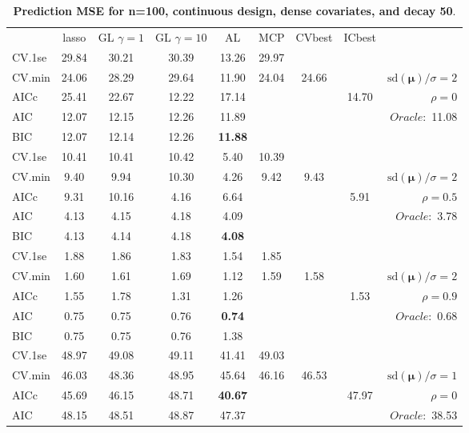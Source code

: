 \clearpage
\begin{table}\vspace{-.5cm}
\caption[l]{ { \bf Prediction MSE for n=100, continuous design, 
dense covariates, and  decay  50}.}
\vspace{-.5cm}
\footnotesize{}
\begin{center}
\begin{tabular}{l*{7}{c}|r}
 & lasso & GL $\gamma=1$ & GL $\gamma=10$ & AL & MCP  & CVbest & ICbest  \\
\cline{1-9}
CV.1se & 29.84 & 30.21 & 30.39 & 13.26 & 29.97 & & & \\
CV.min & 24.06 & 28.29 & 29.64 & 11.90 & 24.04 & 24.66 & & $\mathrm{sd}(\mathbf{\mu})/\sigma=2$ \\
AICc & 25.41 & 22.67 & 12.22 & 17.14 & & & 14.70 &  $\rho=0$ \\
AIC & 12.07 & 12.15 & 12.26 & 11.89 & & & &  \multirow{2}{*}{$Oracle: $ 11.08} \\
BIC & 12.07 & 12.14 & 12.26 & {\bf 11.88} & & & &  \\
 \hline 
CV.1se & 10.41 & 10.41 & 10.42 & 5.40 & 10.39 & & & \\
CV.min & 9.40 & 9.94 & 10.30 & 4.26 & 9.42 & 9.43 & & $\mathrm{sd}(\mathbf{\mu})/\sigma=2$ \\
AICc & 9.31 & 10.16 & 4.16 & 6.64 & & & 5.91 &  $\rho=0.5$ \\
AIC & 4.13 & 4.15 & 4.18 & 4.09 & & & &  \multirow{2}{*}{$Oracle: $ 3.78} \\
BIC & 4.13 & 4.14 & 4.18 & {\bf 4.08} & & & &  \\
 \hline 
CV.1se & 1.88 & 1.86 & 1.83 & 1.54 & 1.85 & & & \\
CV.min & 1.60 & 1.61 & 1.69 & 1.12 & 1.59 & 1.58 & & $\mathrm{sd}(\mathbf{\mu})/\sigma=2$ \\
AICc & 1.55 & 1.78 & 1.31 & 1.26 & & & 1.53 &  $\rho=0.9$ \\
AIC & 0.75 & 0.75 & 0.76 & {\bf 0.74} & & & &  \multirow{2}{*}{$Oracle: $ 0.68} \\
BIC & 0.75 & 0.75 & 0.76 & 1.38 & & & &  \\
 \hline 
CV.1se & 48.97 & 49.08 & 49.11 & 41.41 & 49.03 & & & \\
CV.min & 46.03 & 48.36 & 48.95 & 45.64 & 46.16 & 46.53 & & $\mathrm{sd}(\mathbf{\mu})/\sigma=1$ \\
AICc & 45.69 & 46.15 & 48.71 & {\bf 40.67} & & & 47.97 &  $\rho=0$ \\
AIC & 48.15 & 48.51 & 48.87 & 47.37 & & & &  \multirow{2}{*}{$Oracle: $ 38.53} \\

\end{tabular}
\end{center}
\end{table}
